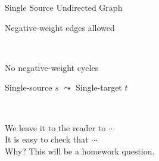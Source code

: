 
\begin{frame}{}
  \begin{center}
    Single Source \qquad Undirected Graph \\[20pt] \pause

    Negative-weight edges allowed \quad {} \\[20pt] \pause

     \qquad\qquad {} \\[20pt] \pause

    No negative-weight cycles \quad {} \\[20pt] \pause
    
    Single-source $s$ $\leadsto$ Single-target $t$
  \end{center}
\end{frame}

\begin{frame}{}

  \begin{center}
     \\[20pt] \pause

    We leave it to the reader to $\cdots$ \\[15pt] \pause
    It is easy to check that $\cdots$ \\[15pt] \pause
    Why? This will be a homework question. \\[15pt] \pause
  \end{center}
\end{frame}

\begin{frame}{}
\end{frame}

% 
